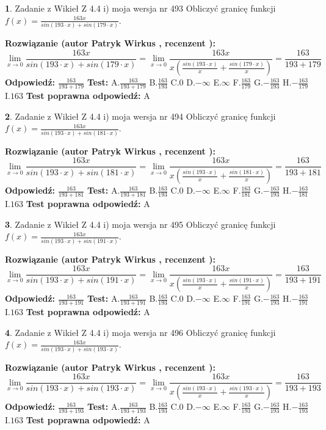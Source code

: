 \documentclass[12pt, a4paper]{article}
\theoremstyle{definition} %
\newtheorem{zad}{}
\newcommand{\zadStart}[1]{\begin{zad}#1\newline}
\newcommand{\zadStop}{\end{zad}}
\newcommand{\rozwStart}[2]{\noindent \textbf{Rozwiązanie (autor #1 , recenzent #2): }\newline}
\newcommand{\rozwStop}{\newline}
\newcommand{\odpStart}{\noindent \textbf{Odpowiedź:}\newline}
\newcommand{\odpStop}{\newline}
\newcommand{\testStart}{\noindent \textbf{Test:}\newline}
\newcommand{\testStop}{\newline}
\newcommand{\kluczStart}{\noindent \textbf{Test poprawna odpowiedź:}\newline}
\newcommand{\kluczStop}{\newline}
\begin{document}
\zadStart{Zadanie z Wikieł Z 4.4 i) moja wersja nr 493}
Obliczyć granicę funkcji $f(x)=\frac{163x}{sin(193\cdot x) +sin(179\cdot x)}$.
\zadStop
\rozwStart{Patryk Wirkus}{}
$$\lim\limits_{x\to 0}\frac{163x}{sin(193\cdot x) +sin(179\cdot x)}=\lim\limits_{x\to 0}\frac{163x}{x(\frac{sin(193\cdot x)}{x}+\frac{sin(179\cdot x)}{x})}=\frac{163}{193+179}$$
\rozwStop
\odpStart
$\frac{163}{193+179}$
\odpStop
\testStart
A.$\frac{163}{193+179}$
B.$\frac{163}{193}$
C.$0$
D.$-\infty$
E.$\infty$
F.$\frac{163}{179}$
G.$-\frac{163}{193}$
H.$-\frac{163}{179}$
I.$163$
\testStop
\kluczStart
A
\kluczStop



\zadStart{Zadanie z Wikieł Z 4.4 i) moja wersja nr 494}
Obliczyć granicę funkcji $f(x)=\frac{163x}{sin(193\cdot x) +sin(181\cdot x)}$.
\zadStop
\rozwStart{Patryk Wirkus}{}
$$\lim\limits_{x\to 0}\frac{163x}{sin(193\cdot x) +sin(181\cdot x)}=\lim\limits_{x\to 0}\frac{163x}{x(\frac{sin(193\cdot x)}{x}+\frac{sin(181\cdot x)}{x})}=\frac{163}{193+181}$$
\rozwStop
\odpStart
$\frac{163}{193+181}$
\odpStop
\testStart
A.$\frac{163}{193+181}$
B.$\frac{163}{193}$
C.$0$
D.$-\infty$
E.$\infty$
F.$\frac{163}{181}$
G.$-\frac{163}{193}$
H.$-\frac{163}{181}$
I.$163$
\testStop
\kluczStart
A
\kluczStop



\zadStart{Zadanie z Wikieł Z 4.4 i) moja wersja nr 495}
Obliczyć granicę funkcji $f(x)=\frac{163x}{sin(193\cdot x) +sin(191\cdot x)}$.
\zadStop
\rozwStart{Patryk Wirkus}{}
$$\lim\limits_{x\to 0}\frac{163x}{sin(193\cdot x) +sin(191\cdot x)}=\lim\limits_{x\to 0}\frac{163x}{x(\frac{sin(193\cdot x)}{x}+\frac{sin(191\cdot x)}{x})}=\frac{163}{193+191}$$
\rozwStop
\odpStart
$\frac{163}{193+191}$
\odpStop
\testStart
A.$\frac{163}{193+191}$
B.$\frac{163}{193}$
C.$0$
D.$-\infty$
E.$\infty$
F.$\frac{163}{191}$
G.$-\frac{163}{193}$
H.$-\frac{163}{191}$
I.$163$
\testStop
\kluczStart
A
\kluczStop



\zadStart{Zadanie z Wikieł Z 4.4 i) moja wersja nr 496}
Obliczyć granicę funkcji $f(x)=\frac{163x}{sin(193\cdot x) +sin(193\cdot x)}$.
\zadStop
\rozwStart{Patryk Wirkus}{}
$$\lim\limits_{x\to 0}\frac{163x}{sin(193\cdot x) +sin(193\cdot x)}=\lim\limits_{x\to 0}\frac{163x}{x(\frac{sin(193\cdot x)}{x}+\frac{sin(193\cdot x)}{x})}=\frac{163}{193+193}$$
\rozwStop
\odpStart
$\frac{163}{193+193}$
\odpStop
\testStart
A.$\frac{163}{193+193}$
B.$\frac{163}{193}$
C.$0$
D.$-\infty$
E.$\infty$
F.$\frac{163}{193}$
G.$-\frac{163}{193}$
H.$-\frac{163}{193}$
I.$163$
\testStop
\kluczStart
A
\kluczStop
\end{document}
